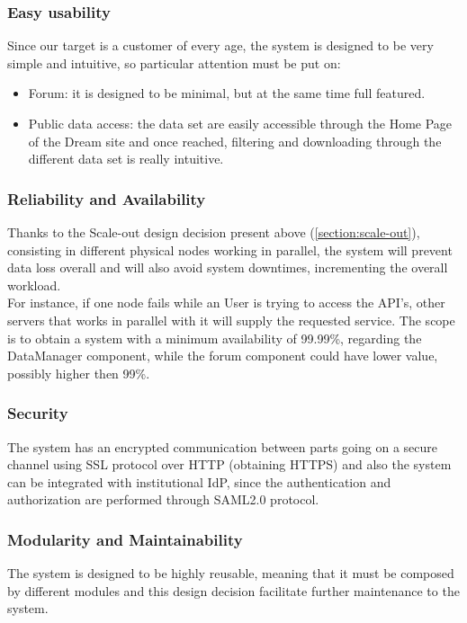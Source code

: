 \subsubsection{Easy usability}
Since our target is a customer of every age, the system is designed to be very simple and intuitive, so particular attention must be put on:
\begin{itemize}
    \item Forum: it is designed to be minimal, but at the same time full featured.
    \item Public data access: the data set are easily accessible through the Home Page of the Dream site and once reached, filtering and downloading through the different data set is really intuitive.
\end{itemize}

\subsubsection{Reliability and Availability}
Thanks to the Scale-out design decision present above (\ref{section:scale-out}), consisting in different physical nodes working in parallel, the system will prevent data loss overall and will also avoid system downtimes, incrementing the overall workload.\\
For instance, if one node fails while an User is trying to access the API's, other servers that works in parallel with it will supply the requested service.
The scope is to obtain a system with a minimum availability of 99.99\%, regarding the DataManager component, while the forum component could have lower value, possibly higher then 99\%.

\subsubsection{Security}
The system has an encrypted communication between parts going on a secure channel using SSL protocol over HTTP (obtaining HTTPS) and also the system can be integrated with institutional IdP, since the authentication and authorization are performed through SAML2.0 protocol.

\subsubsection{Modularity and Maintainability}
The system is designed to be highly reusable, meaning that it must be composed by different modules and this design decision facilitate further maintenance to the system.